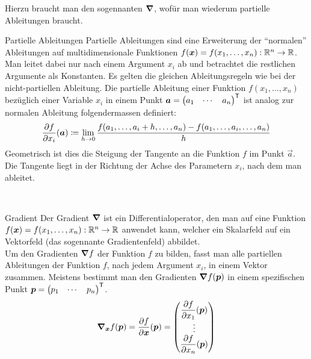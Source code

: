 \begin{appendices}
Hierzu braucht man den sogennanten  $\bm{\nabla}$, wofür man wiederum partielle Ableitungen braucht.
\para{}
\begin{defbox}{Partielle Ableitungen}\label{ref:partielle_ableitungen}
  Partielle Ableitungen sind eine Erweiterung der ``normalen'' Ableitungen auf
  multidimensionale Funktionen $f(\bm{x}) = f(x_1,\ldots,x_n): \mathbb{R}^n \to \mathbb{R}$.
  Man leitet dabei nur nach einem Argument $x_i$ ab und betrachtet die restlichen Argumente als Konstanten.
  Es gelten die gleichen Ableitungsregeln wie bei der nicht-partiellen Ableitung.
  Die partielle Ableitung einer Funktion $f(x_1,\ldots,x_n)$ bezüglich einer
  Variable $x_i$ in einem Punkt $\bm{a} = \begin{pmatrix} a_1 & \cdots & a_n \end{pmatrix}^{\mathsf{T}}$
  ist analog zur normalen Ableitung folgendermassen definiert:
  \begin{equation*}
    \frac{\partial f}{\partial x_i}(\bm{a}) \coloneqq \lim_{h \to 0} \frac{f(a_1,\ldots,a_i + h,\ldots,a_n)-f(a_1,\ldots,a_i,\ldots,a_n)}{h}
  \end{equation*}
  Geometrisch ist dies die Steigung der Tangente an die Funktion $f$ im Punkt
  $\vec{a}$. Die Tangente liegt in der Richtung der Achse des Parametern $x_i$, nach dem man ableitet.
\end{defbox}
\\
\begin{defbox}{Gradient}
  Der Gradient $\bm{\nabla}$ ist ein Differentialoperator, den man auf eine
  Funktion $f(\bm{x}) = f(x_1,\ldots,x_n): \mathbb{R}^n \to \mathbb{R}$ anwendet kann, welcher ein Skalarfeld auf ein Vektorfeld (das sogennante Gradientenfeld) abbildet.\\
  Um den Gradienten $\bm{\nabla}f$ der Funktion $f$ zu bilden, fasst man alle partiellen Ableitungen der Funktion $f$, nach jedem
  Argument $x_i$, in einem Vektor zusammen. Meistens bestimmt man den Gradienten
  $\bm{\nabla} f(\bm{p})$ in einem spezifischen Punkt $\bm{p} =
  \begin{pmatrix} p_1 & \cdots & p_n \end{pmatrix}^{\mathsf{T}}$.
  \begin{equation*}
    \bm{\nabla}_{\bm{x}} f(\bm{p}) = \displaystyle\frac{\partial f}{\partial \bm{x}}(\bm{p}) =
    \begin{pmatrix}
      \displaystyle\frac{\partial f}{\partial x_1}(\bm{p}) \\
      \vdots \\
      \displaystyle\frac{\partial f}{\partial x_n}(\bm{p}) \\
    \end{pmatrix}
  \end{equation*}


\end{defbox}
\end{appendices}
